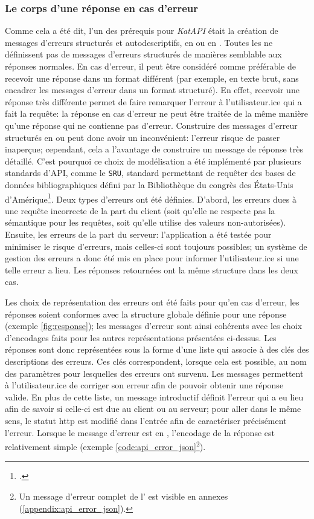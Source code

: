 \subsubsection{Le corps d'une réponse en cas d'erreur}
Comme cela a été dit, l'un des prérequis pour \textit{KatAPI} était la création de messages d'erreurs structurés et autodescriptifs, en \tei{} ou en \json{}. Toutes les \api{} ne définissent pas de messages d'erreurs structurés de manières semblable aux réponses normales. En cas d'erreur, il peut être considéré comme préférable de recevoir une réponse dans un format différent (par exemple, en texte brut, sans encadrer les messages d'erreur dans un format structuré). En effet, recevoir une réponse très différente permet de faire remarquer l'erreur à l'utilisateur.ice qui a fait la requête: la réponse en cas d'erreur ne peut être traitée de la même manière qu'une réponse qui ne contienne pas d'erreur. Construire des messages d'erreur structurés en \json{} ou \xml{} peut donc avoir un inconvénient: l'erreur risque de passer inaperçue; cependant, cela a l'avantage de construire un message de réponse très détaillé. C'est pourquoi ce choix de modélisation a été implémenté par plusieurs standards d'API, comme le \texttt{SRU}, standard permettant de requêter des bases de données bibliographiques défini par la Bibliothèque du congrès des États-Unis d'Amérique\footcite{noauthor_sru_2018}. Deux types d'erreurs ont été définies. D'abord, les erreurs dues à une requête incorrecte de la part du client (soit qu'elle ne respecte pas la sémantique pour les requêtes, soit qu'elle utilise des valeurs non-autorisées). Ensuite, les erreurs de la part du serveur: l'application a été testée pour minimiser le risque d'erreurs, mais celles-ci sont toujours possibles; un système de gestion des erreurs a donc été mis en place pour informer l'utilisateur.ice si une telle erreur a lieu. Les réponses retournées ont la même structure dans les deux cas. 

Les choix de représentation des erreurs ont été faits pour qu'en cas d'erreur, les réponses soient conformes avec la structure globale définie pour une réponse (exemple \ref{fig:response}); les messages d'erreur sont ainsi cohérents avec les choix d'encodages faits pour les autres représentations présentées ci-dessus. Les réponses sont donc représentées sous la forme d'une liste qui associe à des clés des descriptions des erreurs. Ces clés correspondent, lorsque cela est possible, au nom des paramètres pour lesquelles des erreurs ont survenu. Les messages permettent à l'utilisateur.ice de corriger son erreur afin de pouvoir obtenir une réponse valide. En plus de cette liste, un message introductif définit l'erreur qui a eu lieu afin de savoir si celle-ci est due au client ou au serveur; pour aller dans le même sens, le statut \gls{http} est modifié dans l'entrée afin de caractériser précisément l'erreur. Lorsque le message d'erreur est en \json{}, l'encodage de la réponse est relativement simple (exemple \ref{code:api_error_json}\footnote{
	Un message d'erreur complet de l'\api{} est visible en annexes (\ref{appendix:api_error_json}).
}).

